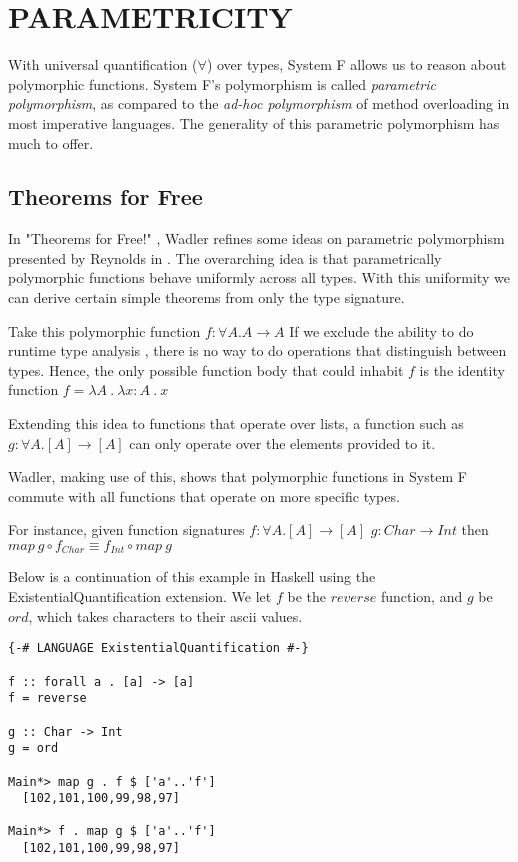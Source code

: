 \chapter{PARAMETRICITY}\label{ch:parametricity}
With universal quantification ($\forall $) over types, System F allows us to reason about polymorphic functions. System F's polymorphism is called \emph{parametric polymorphism}, as compared to the \emph{ad-hoc polymorphism} of method overloading in most imperative languages. The generality of this parametric polymorphism has much to offer.

\section{Theorems for Free}
In "Theorems for Free!" \cite{theoremsForFree}, Wadler refines some ideas on parametric polymorphism presented by Reynolds in \cite{reynolds}. The overarching idea is that parametrically polymorphic functions behave uniformly across all types. With this uniformity we can derive certain simple theorems from only the type signature.

Take this polymorphic function $f : \forall A . A \rightarrow A$
If we exclude the ability to do runtime type analysis \cite{vytinFree}, there is no way to do operations that distinguish between types. Hence, the only possible function body that could inhabit $f$ is the identity function $f = \lambda A\ .\ \lambda x : A\ .\ x $

Extending this idea to functions that operate over lists, a function such as $g : \forall A . [A] \rightarrow [A] $ can only operate over the elements provided to it.

Wadler, making use of this, shows that polymorphic functions in System F commute with all functions that operate on more specific types.

For instance, given function signatures
$f : \forall A . [A] \rightarrow [A] $
$g : Char \rightarrow Int $
then
$map\ g \circ f_{Char} \equiv f_{Int} \circ map\ g$

Below is a continuation of this example in Haskell using the ExistentialQuantification extension. We let $f$ be the $reverse$ function, and $g$ be $ord$, which takes characters to their ascii values.
\begin{verbatim}
{-# LANGUAGE ExistentialQuantification #-}

f :: forall a . [a] -> [a]
f = reverse

g :: Char -> Int
g = ord

Main*> map g . f $ ['a'..'f']
  [102,101,100,99,98,97]

Main*> f . map g $ ['a'..'f']
  [102,101,100,99,98,97]
\end{verbatim}

